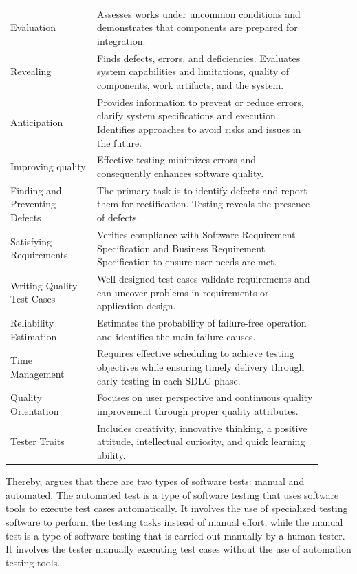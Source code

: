 \begin{longtable}{p{0.25\linewidth}p{0.65\linewidth}}
    Evaluation & Assesses works under uncommon conditions and demonstrates that components are prepared for integration. \\ \addlinespace \hline
    Revealing & Finds defects, errors, and deficiencies. Evaluates system capabilities and limitations, quality of components, work artifacts, and the system. \\ \addlinespace \hline
    Anticipation & Provides information to prevent or reduce errors, clarify 
    system specifications and execution. Identifies approaches to avoid
     risks and issues in the future. \\ \addlinespace \hline
    Improving quality & Effective testing minimizes errors and consequently  
    enhances software quality. \\ \addlinespace \hline
    Finding and Preventing Defects & The primary task is to identify defects and report 
    them for rectification. Testing reveals the presence of defects. \\ \addlinespace \hline
    Satisfying Requirements & Verifies compliance with Software Requirement Specification 
    and Business Requirement Specification to ensure user needs are met. \\ \addlinespace \hline
    Writing Quality Test Cases & Well-designed test cases validate requirements 
    and can uncover problems in requirements or application design. \\ \addlinespace \hline
    Reliability Estimation & Estimates the probability of failure-free operation
     and identifies the main failure causes. \\ \addlinespace \hline
    Time Management & Requires effective scheduling to achieve testing objectives 
    while ensuring timely delivery through early testing in each SDLC phase. \\ \addlinespace \hline
    Quality Orientation & Focuses on user perspective and continuous quality 
    improvement through proper quality attributes. \\ \addlinespace \hline
    Tester Traits & Includes creativity, innovative thinking, a positive attitude, intellectual curiosity, and quick learning ability. \\ 
\end{longtable}

Thereby, \cite{thant2023impact} argues that there are two types of software tests: manual and automated. The automated test is a type of software testing that uses software tools to execute test cases automatically. It 
involves the use of specialized testing software to perform the testing tasks instead of manual effort, while the manual test is a type of software 
testing that is carried out manually by a human tester. It involves the tester manually executing test cases without the use of automation testing tools.

